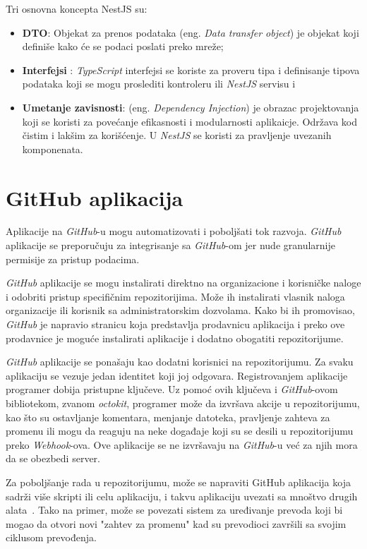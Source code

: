 Tri osnovna koncepta NestJS su:
\begin{itemize}
\item \textbf{DTO}: Objekat za prenos podataka (eng. \textit{Data transfer object}) je objekat 
koji definiše kako će se podaci poslati preko mreže;
\item \textbf{Interfejsi} : \textit{TypeScript} interfejsi se koriste za proveru tipa i 
definisanje tipova podataka koji se mogu proslediti kontroleru ili \textit{NestJS} servisu i
\item \textbf{Umetanje zavisnosti}: (eng. \textit{Dependency Injection}) je obrazac projektovanja 
koji se koristi za povećanje efikasnosti i modularnosti aplikaicje. Održava kod čistim i 
lakšim za korišćenje. U \textit{NestJS} se koristi za pravljenje uvezanih komponenata.~\cite{nest_getting_started}
\end{itemize}

\section{GitHub aplikacija}\label{sec:github_app}
Aplikacije na \textit{GitHub}-u mogu automatizovati i poboljšati tok razvoja. \textit{GitHub} 
aplikacije se preporučuju za integrisanje sa \textit{GitHub}-om jer nude granularnije permisije 
za pristup podacima. 

\textit{GitHub} aplikacije se mogu instalirati direktno na organizacione i korisničke naloge i 
odobriti pristup specifičnim repozitorijima. Može ih instalirati vlasnik naloga organizacije 
ili korisnik sa administratorskim dozvolama. Kako bi ih promovisao, \textit{GitHub} je napravio
stranicu koja predstavlja prodavnicu aplikacija i preko ove prodavnice je moguće instalirati 
aplikacije i dodatno obogatiti repozitorijume.

\textit{GitHub} aplikacije se ponašaju kao dodatni korisnici na repozitorijumu. Za svaku 
aplikaciju se vezuje jedan identitet koji joj odgovara. Registrovanjem aplikacije programer 
dobija pristupne ključeve. Uz pomoć ovih ključeva i \textit{GitHub}-ovom bibliotekom, zvanom \textit{octokit},
programer može da izvršava akcije u repozitorijumu, kao što su ostavljanje komentara,
menjanje datoteka, pravljenje zahteva za promenu ili mogu da reaguju na neke događaje koji su se 
desili u repozitorijumu preko \textit{Webhook}-ova. Ove aplikacije se ne izvršavaju na 
\textit{GitHub}-u već za njih mora da se obezbedi server. 

Za poboljšanje rada u repozitorijumu, može se napraviti GitHub aplikacija koja sadrži više skripti 
ili celu aplikaciju, i takvu aplikaciju uvezati sa mnoštvo drugih alata~\cite{github_apps}. Tako na 
primer, može se povezati sistem za uređivanje prevoda koji bi mogao da otvori novi "zahtev za promenu"
kad su prevodioci završili sa svojim ciklusom prevođenja.


